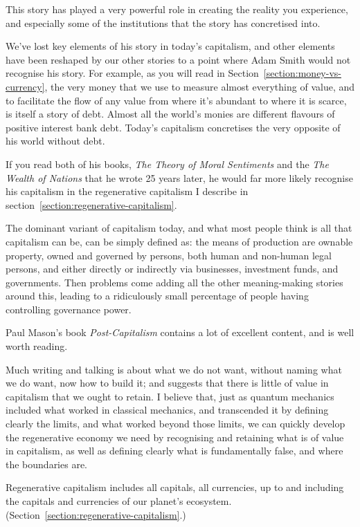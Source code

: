 This story has played a very powerful role in creating the reality you experience, and especially some of the institutions that the story has concretised into.


We’ve lost key elements of his story in today’s capitalism, and other elements have been reshaped by our other stories to a point where Adam Smith would not recognise his story. For example, as you will read in Section~\ref{section:money-vs-currency}, the very money that we use to measure almost everything of value, and to facilitate the flow of any value from where it's abundant to where it is scarce, is itself a story of debt. Almost all the world’s monies are different flavours of positive interest bank debt. Today's capitalism concretises the very opposite of his world without debt.


If you read both of his books, \emph{The Theory of Moral Sentiments}\cite{smith-moral} and the \emph{The Wealth of Nations}\cite{smith-wealth} that he wrote 25 years later, he would far more likely recognise his capitalism in the regenerative capitalism I describe in section~\ref{section:regenerative-capitalism}.


The dominant variant of capitalism today, and what most people think is all that capitalism can be, can be simply defined as: the means of production are ownable property, owned and governed by persons, both human and non-human legal persons, and either directly or indirectly via businesses, investment funds, and governments. Then problems come adding all the other meaning\hyp{}making stories around this, leading to a ridiculously small percentage of people having controlling governance power. 


Paul Mason's book\cite{mason-post-capitalism} \emph{Post-Capitalism} contains a lot of excellent content, and is well worth reading. 


Much writing and talking is about what we do not want, without naming what we do want, now how to build it; and suggests that there is little of value in capitalism that we ought to retain. I believe that, just as quantum mechanics included what worked in classical mechanics, and transcended it by defining clearly the limits, and what worked beyond those limits, we can quickly develop the regenerative economy we need by recognising and retaining what is of value in capitalism, as well as defining clearly what is fundamentally false, and where the boundaries are. 


Regenerative capitalism includes all capitals, all currencies, up to and including the capitals and currencies of our planet's ecosystem. (Section~\ref{section:regenerative-capitalism}.)


